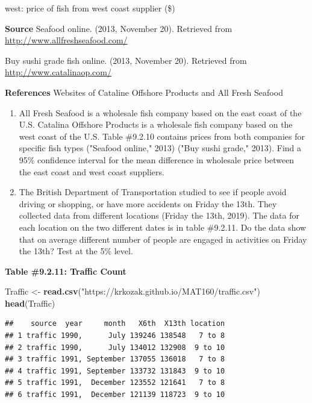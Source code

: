 \documentclass[
]{book}
\newenvironment{Shaded}{\begin{snugshade}}{\end{snugshade}}
\newcommand{\KeywordTok}[1]{\textcolor[rgb]{0.13,0.29,0.53}{\textbf{#1}}}
\newcommand{\NormalTok}[1]{#1}
\newcommand{\StringTok}[1]{\textcolor[rgb]{0.31,0.60,0.02}{#1}}
\begin{document}
west: price of fish from west coast supplier (\$)

\textbf{Source}
Seafood online. (2013, November 20). Retrieved from \url{http://www.allfreshseafood.com/}

Buy sushi grade fish online. (2013, November 20). Retrieved from \url{http://www.catalinaop.com/}

\textbf{References}
Websites of Cataline Offshore Products and All Fresh Seafood

\begin{enumerate}
\def\labelenumi{\arabic{enumi}.}
\setcounter{enumi}{3}
\item
  All Fresh Seafood is a wholesale fish company based on the east coast of the U.S. Catalina Offshore Products is a wholesale fish company based on the west coast of the U.S. Table \#9.2.10 contains prices from both companies for specific fish types ("Seafood online," 2013) ("Buy sushi grade," 2013). Find a 95\% confidence interval for the mean difference in wholesale price between the east coast and west coast suppliers.
\item
  The British Department of Transportation studied to see if people avoid driving or shopping, or have more accidents on Friday the 13th. They collected data from different locations (Friday the 13th, 2019). The data for each location on the two different dates is in table \#9.2.11. Do the data show that on average different number of people are engaged in activities on Friday the 13th? Test at the 5\% level.
\end{enumerate}

\textbf{Table \#9.2.11: Traffic Count}

\begin{Shaded}
\begin{Highlighting}[]
\NormalTok{Traffic <-}\StringTok{ }\KeywordTok{read.csv}\NormalTok{(}\StringTok{"https://krkozak.github.io/MAT160/traffic.csv"}\NormalTok{)}
\KeywordTok{head}\NormalTok{(Traffic)}
\end{Highlighting}
\end{Shaded}

\begin{verbatim}
##    source  year     month   X6th  X13th location
## 1 traffic 1990,      July 139246 138548   7 to 8
## 2 traffic 1990,      July 134012 132908  9 to 10
## 3 traffic 1991, September 137055 136018   7 to 8
## 4 traffic 1991, September 133732 131843  9 to 10
## 5 traffic 1991,  December 123552 121641   7 to 8
## 6 traffic 1991,  December 121139 118723  9 to 10
\end{verbatim}
\end{document}
